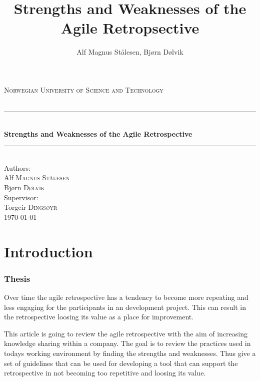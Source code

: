 \documentclass{article}
\newcommand{\HRule}{\rule{\linewidth}{0.5mm}}
\begin{document}
\title{Strengths and Weaknesses of the Agile Retropsective}

\author{Alf Magnus Stålesen, Bjørn Dølvik}
\begin{titlepage}
\begin{center}

\textsc{\LARGE Norwegian University of Science and Technology}\\[1.5cm]

\textsc{\Large }\\[0.5cm]

\HRule \\[0.4cm]
{ \huge \bfseries Strengths and Weaknesses of the Agile Retrospective\\[0.4cm] }

\HRule \\[1.5cm]

{\large Authors:}\\

Alf \textsc{Magnus Stålesen}\\
Bjørn \textsc{Dølvik}\\[1.0cm]

{\large Supervisor:}\\

Torgeir \textsc{Dingsøyr}\\[1.0cm]

{\large \today}

\end{center}
\end{titlepage}

\begin{abstract}
\end{abstract}
\clearpage

\tableofcontents
\clearpage

\part{Introduction}
\section{Thesis}
Over time the agile retrospective has a tendency to become more repeating and less engaging for the participants in an development project. This can result in the retrospective loosing its value as a place for improvement. 

This article is going to review the agile retrospective with the aim of increasing knowledge sharing within a company. The goal is to review the practices used in todays working environment by finding the strengths and weaknesses. Thus give a set of guidelines that can be used for developing a tool that can support the retrospective in not becoming too repetitive and loosing its value.
\clearpage
\end{document}
